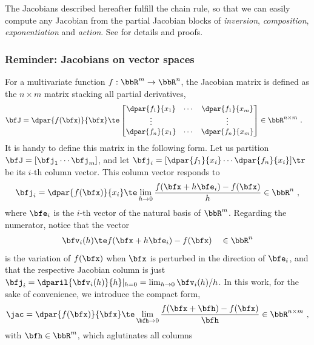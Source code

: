 The Jacobians described hereafter fulfill the chain rule, so that we can easily compute any Jacobian from the partial Jacobian blocks of \emph{inversion}, \emph{composition}, \emph{exponentiation} and \emph{action}.
See  for details and proofs.


\subsubsection[Jacobians on vector spaces]{Reminder: Jacobians on vector spaces}

For a multivariate function $f:\bbR^m\to\bbR^n$, the Jacobian matrix is defined as the $n\times m$ matrix stacking all partial derivatives,
%
\begin{align}\label{equ:jac_Rn_matrix}
\bfJ = \dpar{f(\bfx)}{\bfx} &\te \begin{bmatrix}
\dpar{f_1}{x_1} & \cdots & \dpar{f_1}{x_m} \\
\vdots && \vdots \\
\dpar{f_n}{x_1} & \cdots & \dpar{f_n}{x_m} 
\end{bmatrix} \in\bbR^{n\times m}
~.
\end{align}
%
It is handy to define this matrix in the following form. Let us partition $\bfJ=[\bfj_1\cdots\bfj_m]$, and let $\bfj_i=[\dpar{f_1}{x_i}\cdots\dpar{f_n}{x_i}]\tr$ be its $i$-th column vector. This column vector responds to
%
\begin{align}\label{equ:jac_Rn_i}
\bfj_i = \dpar{f(\bfx)}{x_i} \te \lim_{h\to0}\frac{f(\bfx+h\bfe_i)-f(\bfx)}{h} \in \bbR^n
~,
\end{align}
%
where $\bfe_i$ is the $i$-th vector of the natural basis of $\bbR^m$.
Regarding the numerator, notice that the vector 
%
\begin{align}\label{equ:jac_Rn_vec}
\bfv_i(h) \te f(\bfx+h\bfe_i)-f(\bfx) \quad \in\bbR^n
\end{align}
%
is the variation of $f(\bfx)$ when $\bfx$ is perturbed in the direction of $\bfe_i$, and that the respective Jacobian column is just $\bfj_i=\dparil{\bfv_i(h)}{h}|_{h=0}=\lim_{h\to0}\bfv_i(h)/h$.
In this work, for the sake of convenience, we introduce the compact form,
%
\begin{align}\label{equ:jac_Rn}
\mjac{}{}=\dpar{f(\bfx)}{\bfx}\te\lim_{\bfh\to0}\frac{f(\bfx+\bfh)-f(\bfx)}{\bfh}
\in\bbR^{n\times m}
~,
\end{align}
%
with $\bfh\in\bbR^m$, which aglutinates all columns  
